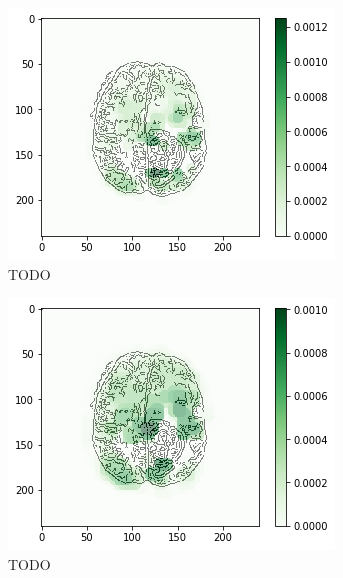 \begin{figure}[H]
    \centering
    \begin{subfigure}{.33\textwidth}
        \centering
        \includegraphics[width=\linewidth]{chapters/06_hdm/b_Brats18_TCIA08_242_1_L2/29.png}
        \caption{TODO}
    \end{subfigure}%
    \begin{subfigure}{.33\textwidth}
        \centering
        \includegraphics[width=\linewidth]{chapters/06_hdm/circle15/9.png}
        \caption{TODO}
    \end{subfigure}
        \begin{subfigure}{.33\textwidth}
        \centering

\end{subfigure}
\end{figure}
